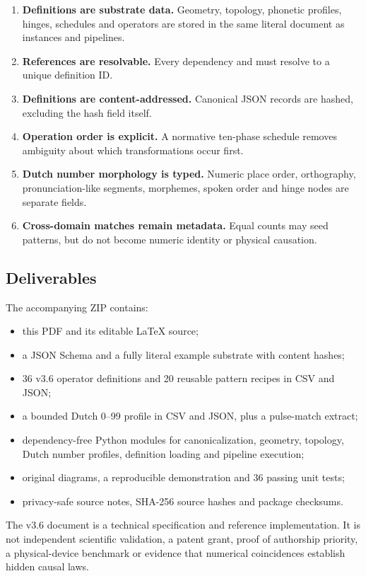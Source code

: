 \documentclass[10pt,a4paper]{article}
\newcommand{\code}[1]{\texttt{\detokenize{#1}}}
\begin{document}
\begin{enumerate}
\item \textbf{Definitions are substrate data.} Geometry, topology, phonetic profiles, hinges, schedules and operators are stored in the same literal document as instances and pipelines.
\item \textbf{References are resolvable.} Every dependency and \code{definition_ref} must resolve to a unique definition ID.
\item \textbf{Definitions are content-addressed.} Canonical JSON records are hashed, excluding the hash field itself.
\item \textbf{Operation order is explicit.} A normative ten-phase schedule removes ambiguity about which transformations occur first.
\item \textbf{Dutch number morphology is typed.} Numeric place order, orthography, pronunciation-like segments, morphemes, spoken order and hinge nodes are separate fields.
\item \textbf{Cross-domain matches remain metadata.} Equal counts may seed patterns, but do not become numeric identity or physical causation.
\end{enumerate}

\subsection{Deliverables}
The accompanying ZIP contains:

\begin{itemize}
\item this PDF and its editable LaTeX source;
\item a JSON Schema and a fully literal example substrate with content hashes;
\item 36 v3.6 operator definitions and 20 reusable pattern recipes in CSV and JSON;
\item a bounded Dutch 0--99 profile in CSV and JSON, plus a pulse-match extract;
\item dependency-free Python modules for canonicalization, geometry, topology, Dutch number profiles, definition loading and pipeline execution;
\item original diagrams, a reproducible demonstration and 36 passing unit tests;
\item privacy-safe source notes, SHA-256 source hashes and package checksums.
\end{itemize}

\begin{boundarybox}
The v3.6 document is a technical specification and reference implementation. It is not independent scientific validation, a patent grant, proof of authorship priority, a physical-device benchmark or evidence that numerical coincidences establish hidden causal laws.
\end{boundarybox}
\end{document}
